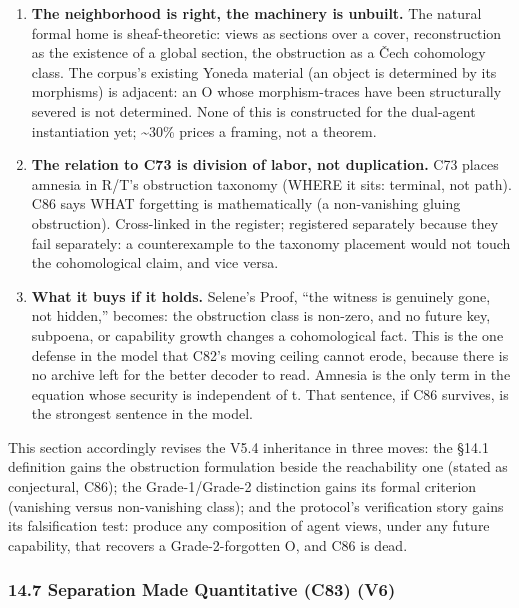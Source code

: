 \documentclass[
  11pt,
]{article}
\providecommand{\tightlist}{%
  \setlength{\itemsep}{0pt}\setlength{\parskip}{0pt}}
\begin{document}
\begin{enumerate}
\def\labelenumi{\arabic{enumi}.}
\tightlist
\item
  \textbf{The neighborhood is right, the machinery is unbuilt.} The
  natural formal home is sheaf-theoretic: views as sections over a
  cover, reconstruction as the existence of a global section, the
  obstruction as a Čech cohomology class. The corpus's existing Yoneda
  material (an object is determined by its morphisms) is adjacent: an O
  whose morphism-traces have been structurally severed is not
  determined. None of this is constructed for the dual-agent
  instantiation yet; \textasciitilde30\% prices a framing, not a
  theorem.
\item
  \textbf{The relation to C73 is division of labor, not duplication.}
  C73 places amnesia in R/T's obstruction taxonomy (WHERE it sits:
  terminal, not path). C86 says WHAT forgetting is mathematically (a
  non-vanishing gluing obstruction). Cross-linked in the register;
  registered separately because they fail separately: a counterexample
  to the taxonomy placement would not touch the cohomological claim, and
  vice versa.
\item
  \textbf{What it buys if it holds.} Selene's Proof, ``the witness is
  genuinely gone, not hidden,'' becomes: the obstruction class is
  non-zero, and no future key, subpoena, or capability growth changes a
  cohomological fact. This is the one defense in the model that C82's
  moving ceiling cannot erode, because there is no archive left for the
  better decoder to read. Amnesia is the only term in the equation whose
  security is independent of t. That sentence, if C86 survives, is the
  strongest sentence in the model.
\end{enumerate}

This section accordingly revises the V5.4 inheritance in three moves:
the §14.1 definition gains the obstruction formulation beside the
reachability one (stated as conjectural, C86); the Grade-1/Grade-2
distinction gains its formal criterion (vanishing versus non-vanishing
class); and the protocol's verification story gains its falsification
test: produce any composition of agent views, under any future
capability, that recovers a Grade-2-forgotten O, and C86 is dead.

\subsubsection{14.7 Separation Made Quantitative (C83)
(V6)}\label{separation-made-quantitative-c83-v6}
\end{document}
